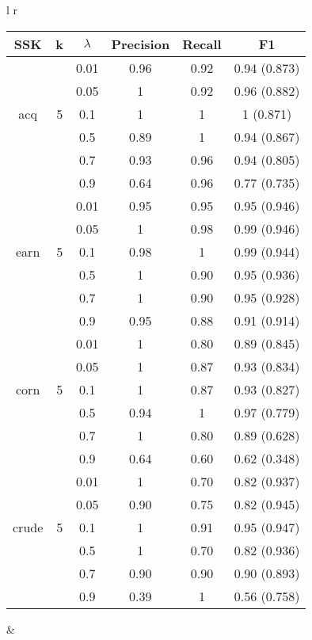 
\begin{tabular}{l r}
\begin{tabular}{| c | c | c | c | c | c | }
	\hline SSK & k&$ \lambda  $& Precision & Recall & F1   \\ \hline	
	
	&& 0.01 & 0.96 & 0.92 & 0.94  (0.873)   \\ 
	&& 0.05 & 1 & 0.92 & 0.96 (0.882)   \\ 
	acq &5& 0.1 & 1& 1 &  1 (0.871)  \\
	&& 0.5 & 0.89 & 1 & 0.94 (0.867)   \\ 
	&& 0.7 & 0.93 & 0.96 & 0.94 (0.805)    \\ 
	&& 0.9 & 0.64 & 0.96 & 0.77   (0.735)  \\ \hline
	
	
	&& 0.01 & 0.95 & 0.95 &  0.95  (0.946)  \\	
&	& 0.05 & 1 & 0.98 &  0.99  (0.946)  \\ 
	earn&5 & 0.1 & 0.98 & 1 &  0.99  (0.944)  \\ 
	&& 0.5 & 1 & 0.90 &  0.95  (0.936)  \\ 
	&& 0.7 & 1 & 0.90 &  0.95  (0.928)  \\
	&& 0.9 & 0.95 & 0.88 &  0.91  (0.914)  \\\hline
	
	
	
	&& 0.01 & 1 & 0.80 & 0.89  (0.845)   \\ 
	&& 0.05 & 1 & 0.87 & 0.93  (0.834)   \\ 
	corn&5 & 0.1 & 1 & 0.87 & 0.93  (0.827)   \\ 
	&& 0.5 & 0.94 & 1 &  0.97 (0.779)  \\ 
	&& 0.7 & 1 & 0.80 & 0.89   (0.628)  \\ 
	&& 0.9 & 0.64 & 0.60 & 0.62  (0.348)   \\ \hline
	
	
	&& 0.01 & 1 & 0.70 &  0.82  (0.937)  \\
	&& 0.05 & 0.90 & 0.75 &  0.82   (0.945) \\ 
	crude&5 & 0.1 & 1 & 0.91 & 0.95 (0.947)    \\ 
	&& 0.5 & 1 & 0.70 &  0.82 (0.936)   \\ 
	&& 0.7 & 0.90 & 0.90 &  0.90  (0.893)  \\
	&& 0.9 & 0.39 & 1 &  0.56  (0.758)  \\\hline
	
	
\end{tabular} &


\end{tabular}
